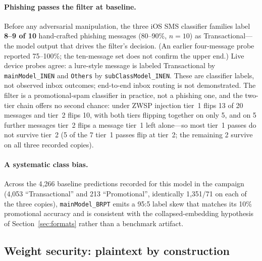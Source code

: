 \documentclass[letterpaper,twocolumn,10pt]{article}
\newcommand{\zwsp}{\mbox{ZWSP}\xspace}
\begin{document}
\paragraph{Phishing passes the filter at baseline.}
Before any adversarial manipulation, the three iOS SMS classifier families
label \textbf{8--9 of 10} hand-crafted phishing messages (80--90\%,
$n=10$) as Transactional---the model output that drives the filter's
decision. (An earlier four-message probe reported 75--100\%; the
ten-message set does not confirm the upper end.)
Live device probes agree: a lure-style message is labeled
Transactional by \texttt{mainModel\_}\allowbreak\texttt{INEN} and \texttt{Others} by
\texttt{subClassModel\_}\allowbreak\texttt{INEN}.
These are classifier labels, not observed inbox outcomes; end-to-end inbox
routing is not demonstrated.
The filter is a promotional-spam classifier in practice, not a phishing
one, and the two-tier chain offers no second chance: under \zwsp{}
injection tier~1 flips 13 of 20 messages and tier~2 flips 10, with both
tiers flipping together on only 5, and on 5 further messages tier~2 flips a
message tier~1 left alone---so most tier~1 passes do not survive tier~2
(5 of the 7 tier~1 passes flip at tier~2; the remaining 2 survive on all
three recorded copies).

\paragraph{A systematic class bias.}
Across the 4{,}266 baseline predictions recorded for this model in the
campaign (4{,}053 ``Transactional'' and 213 ``Promotional'', identically
1{,}351/71 on each of the three copies), \texttt{mainModel\_}\allowbreak\texttt{BRPT} emits a
95:5 label skew that matches its 10\% promotional accuracy and is
consistent with the collapsed-embedding hypothesis of
Section~\ref{sec:formats} rather than a benchmark artifact.

\subsection{Weight security: plaintext by construction}
\label{sec:weights}
\end{document}
